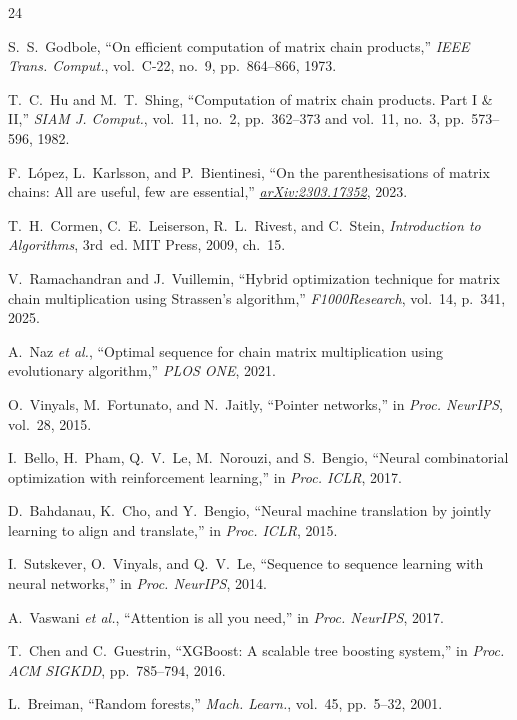 \documentclass[conference]{IEEEtran}
\begin{document}
\begin{thebibliography}{24}

 S.~S.~Godbole, ``On efficient computation of matrix chain products,'' \textit{IEEE Trans. Comput.}, vol.~C-22, no.~9, pp.~864--866, 1973.

 T.~C.~Hu and M.~T.~Shing, ``Computation of matrix chain products. Part I \& II,'' \textit{SIAM J. Comput.}, vol.~11, no.~2, pp.~362--373 and vol.~11, no.~3, pp.~573--596, 1982.

 F.~L\'{o}pez, L.~Karlsson, and P.~Bientinesi, ``On the parenthesisations of matrix chains: All are useful, few are essential,'' \textit{\href{https://arxiv.org/abs/2303.17352}{arXiv:2303.17352}}, 2023.

 T.~H.~Cormen, C.~E.~Leiserson, R.~L.~Rivest, and C.~Stein, \textit{Introduction to Algorithms}, 3rd~ed. MIT Press, 2009, ch.~15.

 V.~Ramachandran and J.~Vuillemin, ``Hybrid optimization technique for matrix chain multiplication using Strassen's algorithm,'' \textit{F1000Research}, vol.~14, p.~341, 2025.

 A.~Naz \textit{et al.}, ``Optimal sequence for chain matrix multiplication using evolutionary algorithm,'' \textit{PLOS ONE}, 2021.

 O.~Vinyals, M.~Fortunato, and N.~Jaitly, ``Pointer networks,'' in \textit{Proc. NeurIPS}, vol.~28, 2015.

 I.~Bello, H.~Pham, Q.~V.~Le, M.~Norouzi, and S.~Bengio, ``Neural combinatorial optimization with reinforcement learning,'' in \textit{Proc. ICLR}, 2017.

 D.~Bahdanau, K.~Cho, and Y.~Bengio, ``Neural machine translation by jointly learning to align and translate,'' in \textit{Proc. ICLR}, 2015.

 I.~Sutskever, O.~Vinyals, and Q.~V.~Le, ``Sequence to sequence learning with neural networks,'' in \textit{Proc. NeurIPS}, 2014.

 A.~Vaswani \textit{et al.}, ``Attention is all you need,'' in \textit{Proc. NeurIPS}, 2017.

 T.~Chen and C.~Guestrin, ``XGBoost: A scalable tree boosting system,'' in \textit{Proc. ACM SIGKDD}, pp.~785--794, 2016.

 L.~Breiman, ``Random forests,'' \textit{Mach. Learn.}, vol.~45, pp.~5--32, 2001.


\end{thebibliography}
\end{document}
